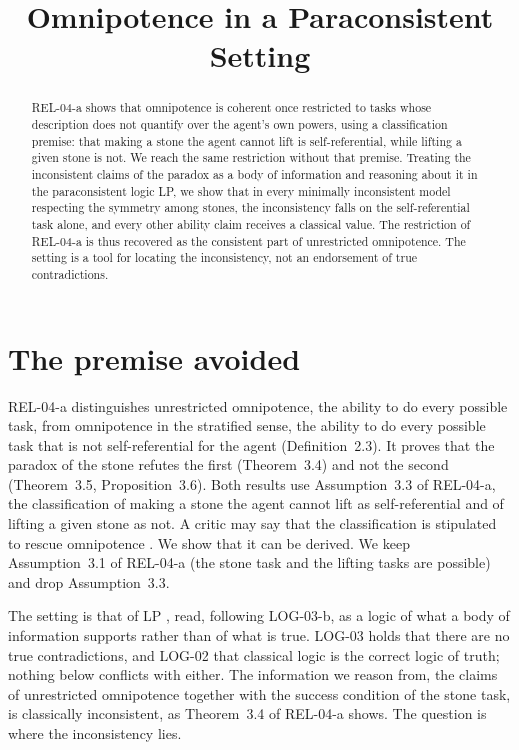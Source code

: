 \documentclass{situationist-preprint}
\title{Omnipotence in a Paraconsistent Setting}
\begin{document}
\maketitle

\begin{abstract}
REL-04-a shows that omnipotence is coherent once restricted to tasks whose description does not quantify over the agent's own powers, using a classification premise: that making a stone the agent cannot lift is self-referential, while lifting a given stone is not. We reach the same restriction without that premise. Treating the inconsistent claims of the paradox as a body of information and reasoning about it in the paraconsistent logic LP, we show that in every minimally inconsistent model respecting the symmetry among stones, the inconsistency falls on the self-referential task alone, and every other ability claim receives a classical value. The restriction of REL-04-a is thus recovered as the consistent part of unrestricted omnipotence. The setting is a tool for locating the inconsistency, not an endorsement of true contradictions.
\end{abstract}

\section{The premise avoided}

REL-04-a distinguishes unrestricted omnipotence, the ability to do every possible task, from omnipotence in the stratified sense, the ability to do every possible task that is not self-referential for the agent (Definition~2.3). It proves that the paradox of the stone refutes the first (Theorem~3.4) and not the second (Theorem~3.5, Proposition~3.6). Both results use Assumption~3.3 of REL-04-a, the classification of making a stone the agent cannot lift as self-referential and of lifting a given stone as not. A critic may say that the classification is stipulated to rescue omnipotence \citep{Savage1967}. We show that it can be derived. We keep Assumption~3.1 of REL-04-a (the stone task and the lifting tasks are possible) and drop Assumption~3.3.

The setting is that of LP \citep{Priest1979}, read, following LOG-03-b, as a logic of what a body of information supports rather than of what is true. LOG-03 holds that there are no true contradictions, and LOG-02 that classical logic is the correct logic of truth; nothing below conflicts with either. The information we reason from, the claims of unrestricted omnipotence together with the success condition of the stone task, is classically inconsistent, as Theorem~3.4 of REL-04-a shows. The question is where the inconsistency lies.
\end{document}
